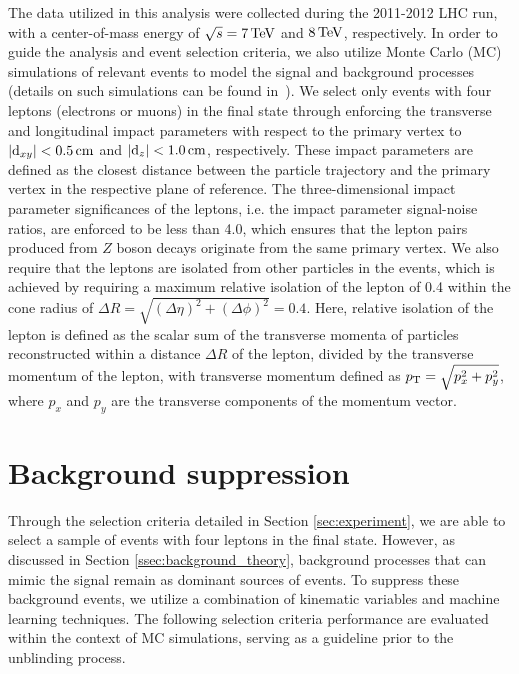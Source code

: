 \documentclass[aps,twocolumn,secnumarabic,balancelastpage,amsmath,amssymb,nofootinbib,floatfix]{revtex4-1}
\newcommand{\TeV}{\,{\rm TeV}}
\newcommand{\cm}{\,{\rm cm}}
\begin{document}
The data utilized in this analysis were collected during the 2011-2012 LHC run, with a center-of-mass energy of $\sqrt{s} = 7\TeV$ and $8\TeV$, respectively. In order to guide the analysis and event selection criteria, we also utilize Monte Carlo (MC) simulations of relevant events to model the signal and background processes (details on such simulations can be found in~\citep{CMS2012}). We select only events with four leptons (electrons or muons) in the final state through enforcing the transverse and longitudinal impact parameters with respect to the primary vertex to $| {\rm d}_{xy} | < 0.5\cm$ and $| {\rm d}_z | < 1.0\cm$, respectively. These impact parameters are defined as the closest distance between the particle trajectory and the primary vertex in the respective plane of reference. The three-dimensional impact parameter significances of the leptons, i.e. the impact parameter signal-noise ratios, are enforced to be less than 4.0, which ensures that the lepton pairs produced from $Z$ boson decays originate from the same primary vertex. We also require that the leptons are isolated from other particles in the events, which is achieved by requiring a maximum relative isolation of the lepton of 0.4 within the cone radius of $\Delta R = \sqrt{\left(\Delta \eta\right)^2 + \left(\Delta \phi\right)^2} = 0.4$. Here, relative isolation of the lepton is defined as the scalar sum of the transverse momenta of particles reconstructed within a distance $\Delta R$ of the lepton, divided by the transverse momentum of the lepton, with transverse momentum defined as $p_{\rm{T}} = \sqrt{p_x^2 + p_y^2}$, where $p_x$ and $p_y$ are the transverse components of the momentum vector. 


\section{Background suppression}
\label{sec:background_suppression}

Through the selection criteria detailed in Section \ref{sec:experiment}, we are able to select a sample of events with four leptons in the final state. However, as discussed in Section \ref{ssec:background_theory}, background processes that can mimic the signal remain as dominant sources of events. To suppress these background events, we utilize a combination of kinematic variables and machine learning techniques. The following selection criteria performance are evaluated within the context of MC simulations, serving as a guideline prior to the unblinding process.
\end{document}
